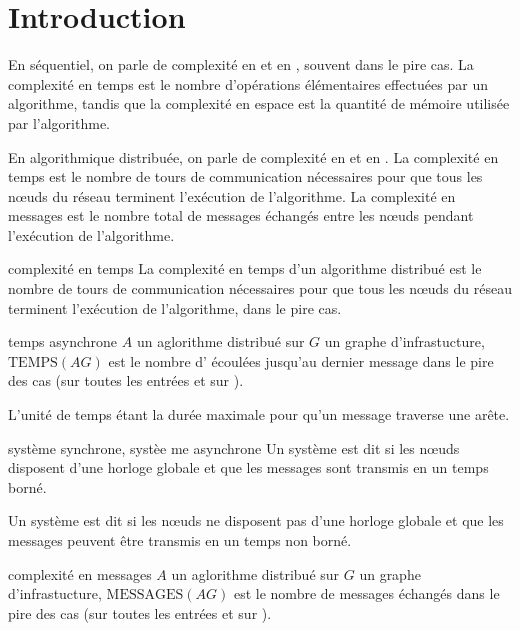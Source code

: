 \section{Introduction}

En séquentiel, on parle de complexité en  et en , souvent dans le pire cas. La complexité en temps est le nombre d'opérations élémentaires effectuées par un algorithme, tandis que la complexité en espace est la quantité de mémoire utilisée par l'algorithme.


En algorithmique distribuée, on parle de complexité en  et en . La complexité en temps est le nombre de tours de communication nécessaires pour que tous les nœuds du réseau terminent l'exécution de l'algorithme. La complexité en messages est le nombre total de messages échangés entre les nœuds pendant l'exécution de l'algorithme. 

\begin{definition}{}{complexité en temps}
  La complexité en temps d'un algorithme distribué est le nombre de tours de communication nécessaires pour que tous les nœuds du réseau terminent l'exécution de l'algorithme, dans le pire cas.
\end{definition}

\begin{definition}{}{temps asynchrone}
  $A$ un aglorithme distribué sur $G$ un graphe d'infrastucture, $\text{TEMPS}(AG)$ est le nombre d' écoulées jusqu'au dernier message  dans le pire des cas (sur toutes les entrées et sur ). \par
  L'unité de temps étant la durée maximale pour qu'un message traverse une arête.

\end{definition}

\begin{definition}{}{système synchrone, systèe me asynchrone}
  Un système est dit  si les nœuds disposent d'une horloge globale et que les messages sont transmis en un temps borné. \par
  Un système est dit  si les nœuds ne disposent pas d'une horloge globale et que les messages peuvent être transmis en un temps non borné.
\end{definition}

\begin{definition}{}{complexité en messages}
$A$ un aglorithme distribué sur $G$ un graphe d'infrastucture, $\text{MESSAGES}(AG)$ est le nombre de messages échangés dans le pire des cas (sur toutes les entrées et sur ). \par

\end{definition}

